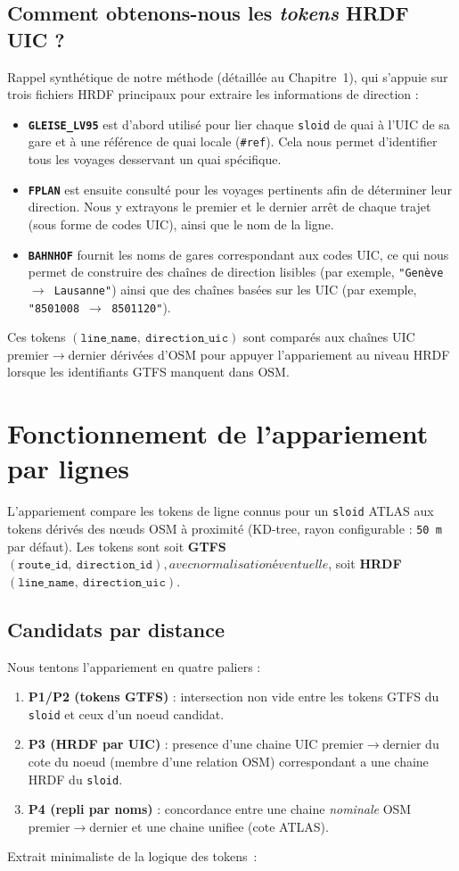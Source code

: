\subsection*{Comment obtenons-nous les \emph{tokens} HRDF UIC ?}
Rappel synthétique de notre méthode (détaillée au Chapitre~1), qui s'appuie sur trois fichiers HRDF principaux pour extraire les informations de direction :
\begin{itemize}
    \item \textbf{\texttt{GLEISE\_LV95}} est d'abord utilisé pour lier chaque \texttt{sloid} de quai à l'UIC de sa gare et à une référence de quai locale (\texttt{\#ref}). Cela nous permet d'identifier tous les voyages desservant un quai spécifique.
    \item \textbf{\texttt{FPLAN}} est ensuite consulté pour les voyages pertinents afin de déterminer leur direction. Nous y extrayons le premier et le dernier arrêt de chaque trajet (sous forme de codes UIC), ainsi que le nom de la ligne.
    \item \textbf{\texttt{BAHNHOF}} fournit les noms de gares correspondant aux codes UIC, ce qui nous permet de construire des chaînes de direction lisibles (par exemple, \texttt{"Genève $\rightarrow$ Lausanne"}) ainsi que des chaînes basées sur les UIC (par exemple, \texttt{"8501008 $\rightarrow$ 8501120"}).
\end{itemize}
Ces tokens \((\texttt{line\_name},\ \texttt{direction\_uic})\) sont comparés aux chaînes UIC premier$\rightarrow$dernier dérivées d'OSM pour appuyer l'appariement au niveau HRDF lorsque les identifiants GTFS manquent dans OSM.

\section{Fonctionnement de l'appariement par lignes}
L'appariement compare les tokens de ligne connus pour un \texttt{sloid} ATLAS aux tokens dérivés des nœuds OSM à proximité (KD-tree, rayon configurable : \texttt{50 m} par défaut). Les tokens sont soit \textbf{GTFS} \((\texttt{route\_id},\ \texttt{direction\_id}), avec normalisation éventuelle\), soit \textbf{HRDF} \((\texttt{line\_name},\ \texttt{direction\_uic})\).

\subsection{Candidats par distance}
Nous tentons l'appariement en quatre paliers :
\begin{enumerate}
  \item \textbf{P1/P2 (tokens GTFS)} : intersection non vide entre les tokens GTFS du \texttt{sloid} et ceux d'un noeud candidat.
  \item \textbf{P3 (HRDF par UIC)} : presence d'une chaine UIC premier$\rightarrow$dernier du cote du noeud (membre d'une relation OSM) correspondant a une chaine HRDF du \texttt{sloid}.
  \item \textbf{P4 (repli par noms)} : concordance entre une chaine \emph{nominale} OSM premier$\rightarrow$dernier et une chaine unifiee (cote ATLAS).
\end{enumerate}
Extrait minimaliste de la logique des tokens :

